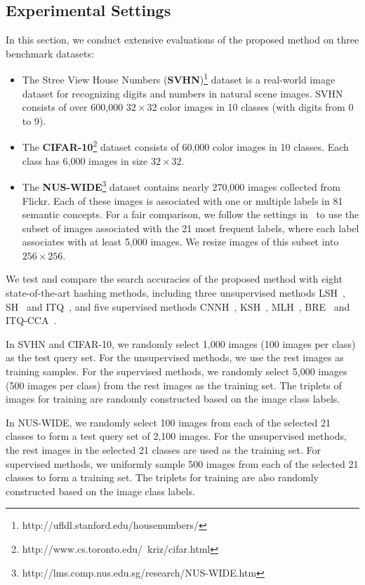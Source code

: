 \documentclass[10pt,twocolumn,letterpaper]{article}
\begin{document}
\subsection{Experimental Settings\label{settings}}
In this section, we conduct extensive evaluations of the proposed method on three benchmark datasets:
\begin{itemize}
\item 
The Stree View House Numbers ({\bf SVHN})\footnote{http://ufldl.stanford.edu/housenumbers/} dataset is a real-world image dataset for recognizing digits and numbers in natural scene images. SVHN consists of over 600,000 $32\times 32$ color images in 10 classes (with digits from 0 to 9).
\item 
The {\bf CIFAR-10}\footnote{http://www.cs.toronto.edu/~kriz/cifar.html} dataset consists of 60,000 color images in 10 classes. Each class has 6,000 images in size $32\times 32$.
\item 
The {\bf NUS-WIDE}\footnote{http://lms.comp.nus.edu.sg/research/NUS-WIDE.htm} dataset contains nearly 270,000 images collected from Flickr.  Each of these images is associated with one or multiple labels in 81 semantic concepts. For a fair comparison, we follow the settings in~\cite{CNNH,AGH} to use the subset of images associated with the 21 most frequent labels, where each label associates with at least 5,000 images. We resize images of this subset into $256\times 256$.
\end{itemize}

We test and compare the search accuracies of the proposed method with eight state-of-the-art hashing methods, including three unsupervised methods LSH~\cite{LSH}, SH~\cite{SH} and ITQ~\cite{ITQ}, and five supervised methods CNNH~\cite{CNNH}, KSH~\cite{KSH}, MLH~\cite{MLH}, BRE~\cite{BRE} and ITQ-CCA~\cite{ITQ}.

In SVHN and CIFAR-10, we randomly select 1,000 images (100 images per class) as the test query set. For the unsupervised methods, we use the rest images as training samples. For the supervised methods, we randomly select 5,000 images (500 images per class) from the rest images as the training set. The triplets of images for training are randomly constructed based on the image class labels.

In NUS-WIDE, we randomly select 100 images from each of the selected 21 classes to form a test query set of 2,100 images. For the unsupervised methods, the rest images in the selected 21 classes are used as the training set. For supervised methods, we uniformly sample 500 images from each of the selected 21 classes to form a training set. The triplets for training are also randomly constructed based on the image class labels.
\end{document}
